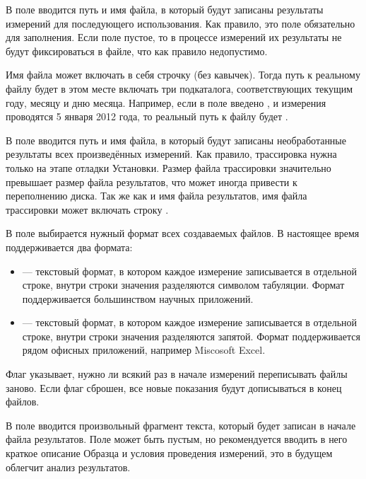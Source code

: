 В поле  вводится путь и имя файла, в который будут записаны результаты измерений для последующего использования. Как правило, это поле обязательно для заполнения. Если поле пустое, то в процессе измерений их результаты не будут фиксироваться в файле, что как правило недопустимо.

Имя файла может включать в себя строчку  (без кавычек). Тогда путь к реальному файлу будет в этом месте включать три
 подкаталога, соответствующих текущим году, месяцу и дню месяца. Например, если в поле введено , и измерения проводятся 5 января 2012 года, то реальный путь к файлу будет .

В поле  вводится путь и имя файла, в который будут записаны необработанные результаты всех произведённых измерений. Как правило, трассировка нужна только на этапе отладки Установки. Размер файла трассировки значительно превышает размер файла результатов, что может иногда привести к переполнению диска. Так же как и имя файла результатов, имя файла трассировки может включать строку .

В поле  выбирается нужный формат всех создаваемых файлов. В настоящее время поддерживается два формата:

\begin{itemize}
\item {} --- текстовый формат, в котором каждое измерение записывается в отдельной строке, внутри строки значения разделяются символом табуляции. Формат поддерживается большинством научных приложений.
\item {} --- текстовый формат, в котором каждое измерение записывается в отдельной строке, внутри строки значения разделяются запятой. Формат поддерживается рядом офисных приложений, например Miscosoft Excel.
\end{itemize}

Флаг  указывает, нужно ли всякий раз в начале измерений переписывать файлы заново. Если флаг сброшен, все новые показания будут дописываться в конец файлов.

В поле  вводится произвольный фрагмент текста, который будет записан в начале файла результатов. Поле может быть пустым, но рекомендуется вводить в него краткое описание Образца и условия проведения измерений, это в будущем облегчит анализ результатов.
